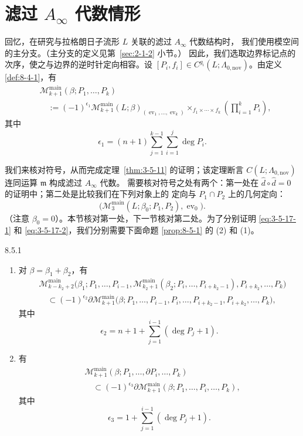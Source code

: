 
\section{滤过 $A_\infty$ 代数情形}
\label{sec:8-5}

回忆，在研究与拉格朗日子流形 $L$ 关联的滤过 $A_\infty$ 代数结构时，
我们使用模空间的主分支。（主分支的定义见第~\ref{sec:2-1-2} 小节。）
因此，我们选取边界标记点的次序，使之与边界的逆时针定向相容。设
$[P_i,f_i]\in C^{g_i}(L;\Lambda_{0,\mathrm{nov}})$。由定义
\ref{def:8-4-1}，有
\[
\begin{aligned}
 &\mathcal M_{k+1}^{\mathrm{main}}(\beta;P_1,\ldots,P_k)\\
 &\quad:={}
 (-1)^{\epsilon_1}
 \mathcal M_{k+1}^{\mathrm{main}}(L;\beta)_
 {(\operatorname{ev}_1,\ldots,\operatorname{ev}_k)}
 \mathop{\times}_{f_1\times\cdots\times f_k}
 \left(\prod_{i=1}^{k}P_i\right),
\end{aligned}
\]
其中
\[
 \epsilon_1=(n+1)
 \sum_{j=1}^{k-1}\sum_{i=1}^{j}\deg P_i.
\]

我们来核对符号，从而完成定理~\ref{thm:3-5-11} 的证明；该定理断言
$C(L;\Lambda_{0,\mathrm{nov}})$ 连同运算 $\mathfrak m$ 构成滤过
$A_\infty$ 代数。
需要核对符号之处有两个：第一处在
$\widehat d\circ\widehat d=0$ 的证明中；第二处是比较我们在下列对象上的
定向与 $P_1\cap P_2$ 上的几何定向：
\[
 \bigl(\mathcal M_3^{\mathrm{main}}(L;\beta_0;P_1,P_2),
 \operatorname{ev}_0\bigr).
\]
（注意 $\beta_0=0$）。本节核对第一处，下一节核对第二处。为了分别证明
\eqref{eq:3-5-17-1} 和 \eqref{eq:3-5-17-2}，我们分别需要下面命题
\ref{prop:8-5-1} 的 (2) 和 (1)。

\newpage
\begin{proposition}{8.5.1}\label{prop:8-5-1}
\begin{enumerate}[label=\textup{(\arabic*)},leftmargin=2.8em]
\item 对 $\beta=\beta_1+\beta_2$，有
\[
\begin{aligned}
 &\mathcal M_{k-k_2+2}^{\mathrm{main}}
 \bigl(\beta_1;P_1,\ldots,P_{i-1},
 \mathcal M_{k_2+1}^{\mathrm{main}}
 (\beta_2;P_i,\ldots,P_{i+k_2-1}),
 P_{i+k_2},\ldots,P_k\bigr)\\
 &\quad\subset
 (-1)^{\epsilon_2}\partial
 \mathcal M_{k+1}^{\mathrm{main}}
 \bigl(\beta;P_1,\ldots,P_{i-1},P_i,\ldots,
 P_{i+k_2-1},P_{i+k_2},\ldots,P_k\bigr),
\end{aligned}
\]
其中
\[
 \epsilon_2=n+1+\sum_{j=1}^{i-1}(\deg P_j+1).
\]

\item 有
\[
\begin{aligned}
 &\mathcal M_{k+1}^{\mathrm{main}}
 (\beta;P_1,\ldots,\partial P_i,\ldots,P_k)\\
 &\quad\subset
 (-1)^{\epsilon_3}\partial
 \mathcal M_{k+1}^{\mathrm{main}}
 (\beta;P_1,\ldots,P_i,\ldots,P_k),
\end{aligned}
\]
其中
\[
 \epsilon_3=1+\sum_{j=1}^{i-1}(\deg P_j+1).
\]
\end{enumerate}
\end{proposition}


